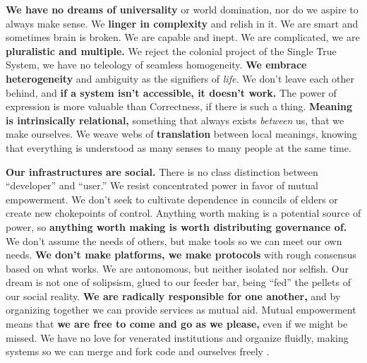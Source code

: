 \textbf{We have no dreams of universality} or world domination, nor do
we aspire to always make sense. We \textbf{linger in complexity} and
relish in it. We are smart and sometimes brain is broken. We are capable
and inept. We are complicated, we are \textbf{pluralistic and multiple.}
We reject the colonial project of the Single True System, we have no
teleology of seamless homogeneity. \textbf{We embrace heterogeneity} and
ambiguity as the signifiers of \emph{life.} We don't leave each other
behind, and \textbf{if a system isn't accessible, it doesn't work.} The
power of expression is more valuable than Correctness, if there is such
a thing. \textbf{Meaning is intrinsically relational,} something that
always exists \emph{between} us, that we make ourselves. We weave webs
of \textbf{translation} between local meanings, knowing that everything
is understood as many senses to many people at the same time.

\textbf{Our infrastructures are social.} There is no class distinction
between ``developer'' and ``user.'' We resist concentrated power in
favor of mutual empowerment. We don't seek to cultivate dependence in
councils of elders or create new chokepoints of control. Anything worth
making is a potential source of power, so \textbf{anything worth making
is worth distributing governance of.} We don't assume the needs of
others, but make tools so we can meet our own needs. \textbf{We don't
make platforms, we make protocols} with rough consensus based on what
works. We are autonomous, but neither isolated nor selfish. Our dream is
not one of solipsism, glued to our feeder bar, being ``fed'' the pellets
of our social reality. \textbf{We are radically responsible for one
another,} and by organizing together we can provide services as mutual
aid. Mutual empowerment means that \textbf{we are free to come and go as
we please,} even if we might be missed. We have no love for venerated
institutions and organize fluidly, making systems so we can merge and
fork code and ourselves freely \cite{bookchinNoteAffinityGroups1969, MeatballWikiRightToFork} .

